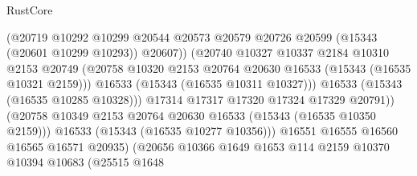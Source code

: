 \begin{lexlean}{RustCore}
\begin{coremodule}
                                      (@20719
                                        @10292
                                        @10299
                                        @20544
                                        @20573
                                        @20579
                                        @20726
                                        @20599
                                        (@15343 (@20601 @10299 @10293))
                                        @20607))
                                    (@20740
                                      @10327
                                      @10337
                                      @2184
                                      @10310
                                      @2153
                                      @20749
                                      (@20758
                                        @10320
                                        @2153
                                        @20764
                                        @20630
                                        @16533
                                        (@15343 (@16535 @10321 @2159)))
                                      @16533
                                      (@15343 (@16535 @10311 @10327)))
                                    @16533
                                    (@15343 (@16535 @10285 @10328)))
                                  @17314
                                  @17317
                                  @17320
                                  @17324
                                  @17329
                                  @20791))
                              (@20758
                                @10349
                                @2153
                                @20764
                                @20630
                                @16533
                                (@15343 (@16535 @10350 @2159)))
                              @16533
                              (@15343 (@16535 @10277 @10356)))
                            @16551
                            @16555
                            @16560
                            @16565
                            @16571
                            @20935)
                          (@20656
                            @10366
                            @1649
                            @1653
                            @114
                            @2159
                            @10370
                            @10394
                            @10683
                            (@25515
                              @1648

\end{coremodule}
\end{lexlean}

